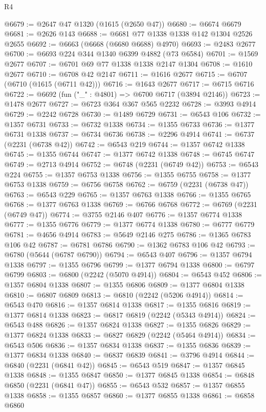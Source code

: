 \begin{lexlean}{R4}
\begin{coremodule}
@6679 := @2647 @47 @1320 (@1615 (@2650 @47))
@6680 := @6674 @6679
@6681 := @2626 @143
@6688 := @6681 @77 @1338 @1338 @142 @1304 @2526 @2655
@6692 := @6663 (@6668 (@6680 @6688) @4970)
@6693 := @2483 @2677
@6700 := @6693 @224 @344 @1340 @6399 @4882 (@73 @6584)
@6701 := @1569 @2677
@6707 := @6701 @69 @77 @1338 @1338 @2147 @1304
@6708 := @1610 @2677
@6710 := @6708 @42 @2147
@6711 := @1616 @2677
@6715 := @6707 (@6710 (@1615 (@6711 @42)))
@6716 := @1643 @2677
@6717 := @6715 @6716
@6722 := @6692 (fun ("_" : @4801) => @6700 @6717 (@3894 @2146))
@6723 := @1478 @2677
@6727 := @6723 @364 @367 @565 @2232
@6728 := @3993 @4914
@6729 := @2242 @6728
@6730 := @1489 @6729
@6731 := @6543 @106
@6732 := @1357 @6731
@6733 := @6732 @1338
@6734 := @1355 @6733
@6736 := @1377 @6731 @1338
@6737 := @6734 @6736
@6738 := @2296 @4914
@6741 := @6737 (@2231 (@6738 @42))
@6742 := @6543 @219
@6744 := @1357 @6742 @1338
@6745 := @1355 @6744
@6747 := @1377 @6742 @1338
@6748 := @6745 @6747
@6749 := @2713 @4914
@6752 := @6748 (@2231 (@6749 @42))
@6753 := @6543 @224
@6755 := @1357 @6753 @1338
@6756 := @1355 @6755
@6758 := @1377 @6753 @1338
@6759 := @6756 @6758
@6762 := @6759 (@2231 (@6738 @47))
@6763 := @6543 @229
@6765 := @1357 @6763 @1338
@6766 := @1355 @6765
@6768 := @1377 @6763 @1338
@6769 := @6766 @6768
@6772 := @6769 (@2231 (@6749 @47))
@6774 := @3755 @2146 @407
@6776 := @1357 @6774 @1338
@6777 := @1355 @6776
@6779 := @1377 @6774 @1338
@6780 := @6777 @6779
@6781 := @4656 @4914
@6783 := @5649 @2146 @275
@6786 := @1365 @6783 @106 @42
@6787 := @6781 @6786
@6790 := @1362 @6783 @106 @42
@6793 := @6780 (@5644 (@6787 @6790))
@6794 := @6543 @407
@6796 := @1357 @6794 @1338
@6797 := @1355 @6796
@6799 := @1377 @6794 @1338
@6800 := @6797 @6799
@6803 := @6800 (@2242 (@5070 @4914))
@6804 := @6543 @452
@6806 := @1357 @6804 @1338
@6807 := @1355 @6806
@6809 := @1377 @6804 @1338
@6810 := @6807 @6809
@6813 := @6810 (@2242 (@5206 @4914))
@6814 := @6543 @470
@6816 := @1357 @6814 @1338
@6817 := @1355 @6816
@6819 := @1377 @6814 @1338
@6823 := @6817 @6819 (@2242 (@5343 @4914))
@6824 := @6543 @488
@6826 := @1357 @6824 @1338
@6827 := @1355 @6826
@6829 := @1377 @6824 @1338
@6833 := @6827 @6829 (@2242 (@5464 @4914))
@6834 := @6543 @506
@6836 := @1357 @6834 @1338
@6837 := @1355 @6836
@6839 := @1377 @6834 @1338
@6840 := @6837 @6839
@6841 := @3796 @4914
@6844 := @6840 (@2231 (@6841 @42))
@6845 := @6543 @519
@6847 := @1357 @6845 @1338
@6848 := @1355 @6847
@6850 := @1377 @6845 @1338
@6854 := @6848 @6850 (@2231 (@6841 @47))
@6855 := @6543 @532
@6857 := @1357 @6855 @1338
@6858 := @1355 @6857
@6860 := @1377 @6855 @1338
@6861 := @6858 @6860

\end{coremodule}
\end{lexlean}
